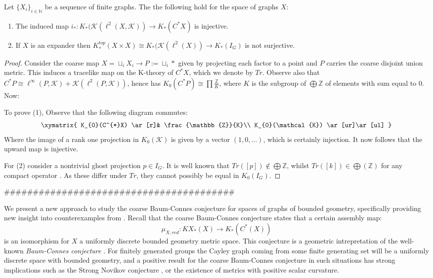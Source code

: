 \begin{proposition}\label{Prop:Ghost}
Let $\lbrace X_{i} \rbrace_{i\in \mathbb{N}}$ be a sequence of finite graphs. The the following hold for the space of graphs $X$:
\begin{enumerate}
\item The induced map $i_{*}:K_{*}(\mathcal{K}(\ell^{2}(X,\mathcal{K})) \rightarrow K_{*}(C^{*}X)$ is injective.
\item If $X$ is an expander then $K_{*}^{top}(X\times X)\cong K_{*}(\mathcal{K}(\ell^{2}(X)) \rightarrow K_{*}(I_{G})$ is not surjective.
\end{enumerate}
\end{proposition}
\begin{proof}
Consider the coarse map $X=\sqcup_{i} X_{i} \rightarrow P:=\sqcup_{i} \ast$ given by projecting each factor to a point and $P$ carries the coarse disjoint union metric. This induces a tracelike map on the K-theory of $C^{*}X$, which we denote by $Tr$. Observe also that $C^{*}P \cong \ell^{\infty}(P,\mathcal{K})+\mathcal{K}(\ell^{2}(P,\mathcal{K}))$, hence has $K_{0}(C^{*}P) \cong \prod \frac{\mathbb{Z}}{K}$, where $K$ is the subgroup of $\bigoplus \mathbb{Z}$ of elements with sum equal to 0. Now:

To prove (1), Observe that the following diagram commutes:
\begin{equation*}
\xymatrix{ K_{0}(C^{*}X) \ar[r]& \frac{\mathbb{Z}}{K}\\
K_{0}(\mathcal{K}) \ar[ur]\ar[ul]
}
\end{equation*}
Where the image of a rank one projection in $K_{0}(\mathcal{K})$ is given by a vector $(1,0,...)$, which is certainly injection. It now follows that the upward map is injective.

For (2) consider a nontrivial ghost projection $p \in I_{G}$. It is well known that $Tr([p]) \not\in \bigoplus \mathbb{Z}$, whilst $Tr([k]) \in \bigoplus(\mathbb{Z})$ for any compact operator \cite{explg1}. As these differ under $Tr$, they cannot possibly be equal in $K_{0}(I_{G})$.
\end{proof}

########################################

We present a new approach to study the coarse Baum-Connes conjecture for spaces of graphs of bounded geometry, specifically providing new insight into counterexamples from \cite{higsonpreprint,MR1911663,explg1}. Recall that the coarse Baum-Connes conjecture states that a certain assembly map:
\begin{equation*}
\mu_{X,red}:KX_{*}(X) \longrightarrow K_{*}(C^{*}(X))
\end{equation*}
is an isomorphism for $X$ a uniformly discrete bounded geometry metric space. This conjecture is a geometric intrepretation of the well-known \textit{Baum-Connes conjecture} \cite{MR1292018}. For finitely generated groups the Cayley graph coming from some finite generating set will be a uniformly discrete space with bounded geometry, and a positive result for the coarse Baum-Connes conjecture in such situations has strong implications such as the Strong Novikov conjecture \cite{MR866507}, or the existence of metrics with positive scalar curvature.


